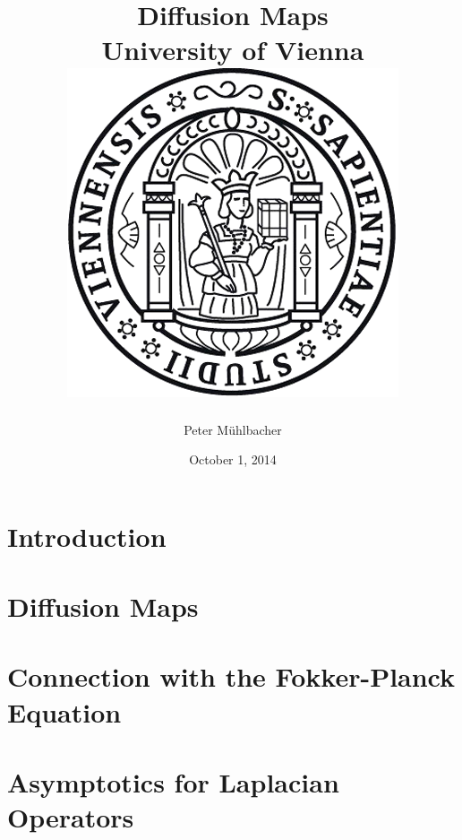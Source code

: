 \documentclass[11pt]{report}
\begin{document}
\title{
	{Diffusion Maps}\\
	{\large University of Vienna}\\
	{\includegraphics{university.png}}
}
\author{Peter Mühlbacher}
\date{October 1, 2014}
\maketitle

\begin{abstract}
\end{abstract}

\tableofcontents

\chapter*{Introduction}


\chapter{Diffusion Maps}


\chapter{Connection with the Fokker-Planck Equation}


\appendix
\chapter{Asymptotics for Laplacian Operators}




\end{document}
